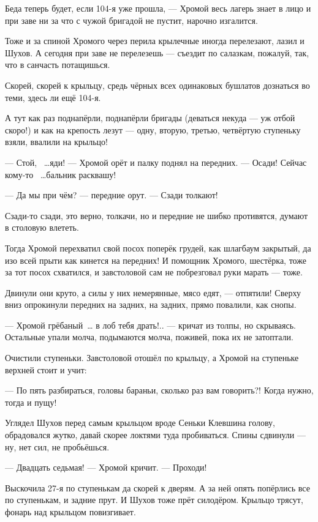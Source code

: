 Беда теперь будет, если 104-я уже прошла, --- Хромой весь лагерь знает в лицо и при заве ни за что с чужой бригадой не пустит, нарочно изгалится.

Тоже и за спиной Хромого через перила крылечные иногда перелезают, лазил и Шухов. А сегодня при заве не перелезешь --- съездит по салазкам, пожалуй, так, что в санчасть потащишься.

Скорей, скорей к крыльцу, средь чёрных всех одинаковых бушлатов дознаться во теми, здесь ли ещё 104-я.

А тут как раз поднапёрли, поднапёрли бригады (деваться некуда --- уж отбой скоро!) и как на крепость лезут --- одну, вторую, третью, четвёртую ступеньку взяли, ввалили на крыльцо!

--- Стой, ~\dots{}яди! --- Хромой орёт и палку поднял на передних. --- Осади! Сейчас кому-то ~\dots{}бальник расквашу!

--- Да мы при чём? --- передние орут. --- Сзади толкают!

Сзади-то сзади, это верно, толкачи, но и передние не шибко противятся, думают в столовую влететь.

Тогда Хромой перехватил свой посох поперёк грудей, как шлагбаум закрытый, да изо всей прыти как кинется на передних! И помощник Хромого, шестёрка, тоже за тот посох схватился, и завстоловой сам не побрезговал руки марать --- тоже.

Двинули они круто, а силы у них немерянные, мясо едят, --- отпятили! Сверху вниз опрокинули передних на задних, на задних, прямо повалили, как снопы.

--- Хромой грёбаный~\dots{} в лоб тебя драть!.. --- кричат из толпы, но скрываясь. Остальные упали молча, подымаются молча, поживей, пока их не затоптали.

Очистили ступеньки. Завстоловой отошёл по крыльцу, а Хромой на ступеньке верхней стоит и учит:

--- По пять разбираться, головы бараньи, сколько раз вам говорить?! Когда нужно, тогда и пущу!

Углядел Шухов перед самым крыльцом вроде Сеньки Клевшина голову, обрадовался жутко, давай скорее локтями туда пробиваться. Спины сдвинули --- ну, нет сил, не пробьёшься.

--- Двадцать седьмая! --- Хромой кричит. --- Проходи!

Выскочила 27-я по ступенькам да скорей к дверям. А за ней опять попёрлись все по ступенькам, и задние прут. И Шухов тоже прёт силодёром. Крыльцо трясут, фонарь над крыльцом повизгивает.

